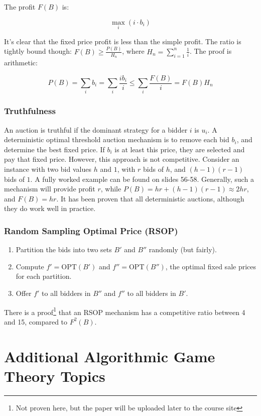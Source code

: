 \documentclass{idc_msc}
\begin{document}
The profit \(F(B)\) is:

\[\max_i (i \cdot b_i)\]

It's clear that the fixed price profit is less than the simple profit.
The ratio is tightly bound though: \(F(B) \ge \frac{P(B)}{H_n}\), where \(H_n = \sum_{i = 1}^n \frac{1}{i}\).
The proof is arithmetic:

\[
  P(B) = \sum_i b_i = \sum_i \frac{ib_i}{i} \le \sum_i \frac{F(B)}{i} = F(B) H_n
\]

\subsubsection{Truthfulness}

An auction is truthful if the dominant strategy for a bidder \(i\) is \(u_i\).
A deterministic optimal threshold auction mechanism is to remove each bid \(b_i\), and determine the best fixed price.
If \(b_i\) is at least this price, they are selected and pay that fixed price.
However, this approach is not competitive.
Consider an instance with two bid values \(h\) and \(1\), with \(r\) bids of \(h\), and \((h-1)(r-1)\) bids of \(1\).
A fully worked example can be found on slides 56-58.
Generally, such a mechanism will provide profit \(r\), while \(P(B) = hr + (h-1)(r-1) \approx 2hr\), and \(F(B) = hr\).
It has been proven that all deterministic auctions, although they do work well in practice.

\subsubsection{Random Sampling Optimal Price (RSOP)}

\begin{enumerate}
  \item Partition the bids into two sets \(B'\) and \(B''\) randomly (but fairly).
  \item Compute \(f' = \text{OPT}(B')\) and \(f'' = \text{OPT}(B'')\), the optimal fixed sale prices for each partition.
  \item Offer \(f'\) to all bidders in \(B''\) and \(f''\) to all bidders in \(B'\).
\end{enumerate}

There is a proof\footnote{Not proven here, but the paper will be uploaded later to the course site} that an RSOP mechanism has a competitive ratio between 4 and 15, compared to \(F^2(B)\).

\section{Additional Algorithmic Game Theory Topics}
\end{document}
